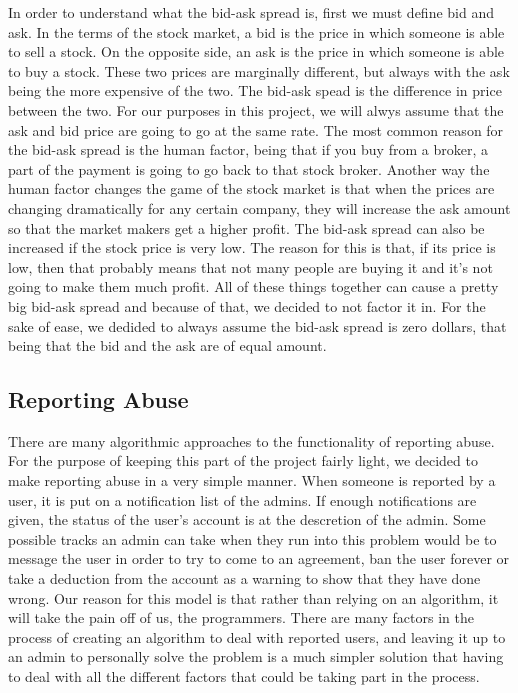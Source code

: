 In order to understand what the bid-ask spread is, first we must define bid and ask. In the terms of the stock market, a bid is the price in which someone is able to sell a stock. On the opposite side, an ask is the price in which someone is able to buy a stock. These two prices are marginally different, but always with the ask being the more expensive of the two. The bid-ask spead is the difference in price between the two. For our purposes in this project, we will alwys assume that the ask and bid price are going to go at the same rate. The most common reason for the bid-ask spread is the human factor, being that if you buy from a broker, a part of the payment is going to go back to that stock broker. Another way the human factor changes the game of the stock market is that when the prices are changing dramatically for any certain company, they will increase the ask amount so that the market makers get a higher profit. The bid-ask spread can also be increased if the stock price is very low. The reason for this is that, if its price is low, then that probably means that not many people are buying it and it's not going to make them much profit. All of these things together can cause a pretty big bid-ask spread and because of that, we decided to not factor it in. For the sake of ease, we dedided to always assume the bid-ask spread is zero dollars, that being that the bid and the ask are of equal amount. 

\subsection{Reporting Abuse}

There are many algorithmic approaches to the functionality of reporting abuse. For the purpose of keeping this part of the project fairly light, we decided to make reporting abuse in a very simple manner. When someone is reported by a user, it is put on a notification list of the admins. If enough notifications are given, the status of the user's account is at the descretion of the admin. Some possible tracks an admin can take when they run into this problem would be to message the user in order to try to come to an agreement, ban the user forever or take a deduction from the account as a warning to show that they have done wrong. Our reason for this model is that rather than relying on an algorithm, it will take the pain off of us, the programmers. There are many factors in the process of creating an algorithm to deal with reported users, and leaving it up to an admin to personally solve the problem is a much simpler solution that having to deal with all the different factors that could be taking part in the process.

